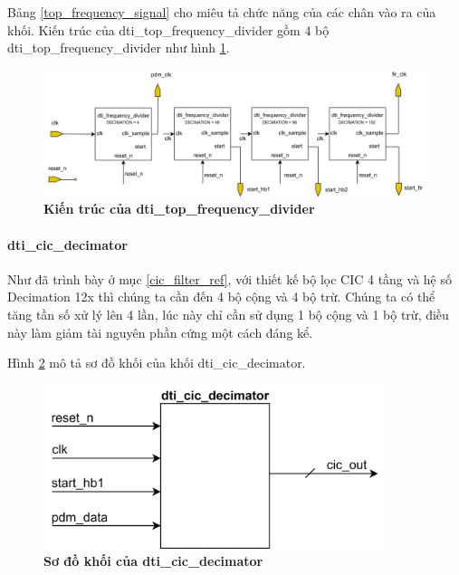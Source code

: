   Bảng \ref{top_frequency_signal} cho miêu tả chức năng của các chân vào ra của khối. Kiến trúc của dti\_top\_frequency\_divider gồm 4 bộ dti\_top\_frequency\_divider như hình \ref{top_frequency_arc}.

\begin{figure}[H]
    \centering
    \includegraphics[width=15cm]{Images/Chuong4/frequency/top_frequency_arc.png}
    \caption[Kiến trúc của dti\_top\_frequency\_divider]{\bfseries \fontsize{12pt}{0pt}\selectfont Kiến trúc của dti\_top\_frequency\_divider}
    \label{top_frequency_arc}
\end{figure}

\paragraph{dti\_cic\_decimator}
 Như đã trình bày ở mục \ref{cic_filter_ref}, với thiết kế bộ lọc CIC 4 tầng và hệ số Decimation 12x thì chúng ta cần đến 4 bộ cộng và 4 bộ trừ. Chúng ta có thể tăng tần số xử lý lên 4 lần, lúc này chỉ cần sử dụng 1 bộ cộng và 1 bộ trừ, điều này làm giảm tài nguyên phần cứng một cách đáng kể.

Hình \ref{cic_top} mô tả sơ đồ khối của khối dti\_cic\_decimator.
\begin{figure}[H]
    \centering
    \includegraphics[width=10cm]{Images/Chuong4/cic/cic_top.png}
    \caption[Sơ đồ khối của dti\_cic\_decimator]{\bfseries \fontsize{12pt}{0pt}\selectfont Sơ đồ khối của dti\_cic\_decimator}
    \label{cic_top}
\end{figure}

